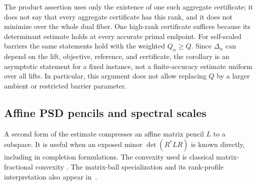 The product assertion uses only the existence of one such aggregate
certificate; it does not say that every aggregate certificate has this
rank, and it does not minimize over the whole dual fiber. One high-rank certificate
suffices because its determinant estimate holds at every accurate primal
endpoint. For self-scaled barriers the same statements hold with the
weighted $Q_\alpha\geq Q$. Since $\Delta_\alpha$ can depend on the lift,
objective, reference, and certificate, the corollary is an asymptotic
statement for a fixed instance, not a finite-accuracy estimate uniform
over all lifts. In particular, this argument does not allow replacing
$Q$ by a larger ambient or restricted barrier parameter.

\subsection{Affine PSD pencils and spectral scales}
A second form of the estimate compresses an affine matrix pencil $L$
to a subspace. It is useful when an exposed minor $\det(R^*LR)$ is
known directly, including in completion formulations. The convexity
used is classical matrix-fractional convexity
\cite[Example~3.4]{BoydVandenberghe2004}.
The matrix-ball specialization and its rank-profile interpretation
also appear in~\cite{CentralPathCompanion}.

